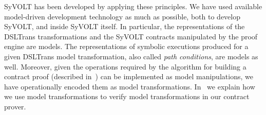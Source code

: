 SyVOLT has been developed by applying these principles. We have used available
model-driven development technology as much as possible, both to develop SyVOLT,
and inside SyVOLT itself. In particular, the representations of the DSLTrans
transformations and the SyVOLT contracts manipulated by the proof engine are
models. The representations of symbolic executions produced for a given DSLTrans
model transformation, also called \emph{path conditions}, are models as well.
Moreover, given the operations required by the algorithm for building a contract
proof (described in~\cite{Lucio2014}) can be implemented as model manipulations,
we have operationally encoded them as model transformations.
In~\cite{LucioVang} we explain how we use model transformations to
verify model transformations in our contract prover.

